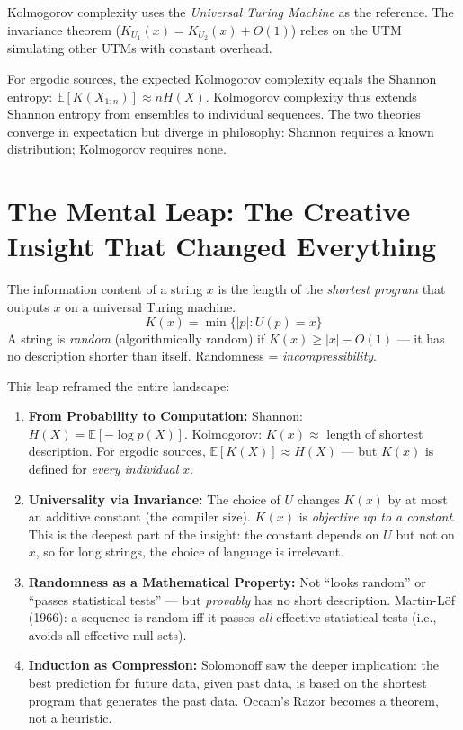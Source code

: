 Kolmogorov complexity uses the \emph{Universal Turing Machine} as the reference. The invariance theorem ($K_{U_1}(x) = K_{U_2}(x) + O(1)$) relies on the UTM simulating other UTMs with constant overhead.

For ergodic sources, the expected Kolmogorov complexity equals the Shannon entropy: $\mathbb{E}[K(X_{1:n})] \approx n H(X)$. Kolmogorov complexity thus extends Shannon entropy from ensembles to individual sequences. The two theories converge in expectation but diverge in philosophy: Shannon requires a known distribution; Kolmogorov requires none.

\section{The Mental Leap: The Creative Insight That Changed Everything}
\label{sec:kolmogorov:leap}

The information content of a string $x$ is the length of the \emph{shortest program} that outputs $x$ on a universal Turing machine.
\[
K(x) = \min \{ |p| : U(p) = x \}
\]
A string is \emph{random} (algorithmically random) if $K(x) \ge |x| - O(1)$ --- it has no description shorter than itself. Randomness = \emph{incompressibility}.

This leap reframed the entire landscape:

\begin{enumerate}
\item \textbf{From Probability to Computation:} Shannon: $H(X) = \mathbb{E}[-\log p(X)]$. Kolmogorov: $K(x) \approx$ length of shortest description. For ergodic sources, $\mathbb{E}[K(X)] \approx H(X)$ --- but $K(x)$ is defined for \emph{every individual} $x$.

\item \textbf{Universality via Invariance:} The choice of $U$ changes $K(x)$ by at most an additive constant (the compiler size). $K(x)$ is \emph{objective up to a constant}. This is the deepest part of the insight: the constant depends on $U$ but not on $x$, so for long strings, the choice of language is irrelevant.

\item \textbf{Randomness as a Mathematical Property:} Not ``looks random'' or ``passes statistical tests'' --- but \emph{provably} has no short description. Martin-L\"of (1966): a sequence is random iff it passes \emph{all} effective statistical tests (i.e., avoids all effective null sets).

\item \textbf{Induction as Compression:} Solomonoff saw the deeper implication: the best prediction for future data, given past data, is based on the shortest program that generates the past data. Occam's Razor becomes a theorem, not a heuristic.
\end{enumerate}

